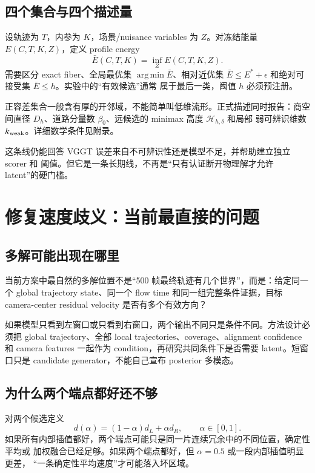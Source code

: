 \documentclass[UTF8,a4paper,11pt]{ctexart}
\newcommand{\argminop}{\operatorname*{arg\,min}}
\begin{document}
\subsection{四个集合与四个描述量}

设轨迹为 $T$，内参为 $K$，场景/nuisance variables 为 $Z$。对冻结能量
$E(C,T,K,Z)$，定义 profile energy
\begin{equation}
  \bar E(C,T,K)=\inf_Z E(C,T,K,Z).
\end{equation}
需要区分 exact fiber、全局最优集 $\argminop\bar E$、相对近优集
$\bar E\le E^*+\epsilon$ 和绝对可接受集 $\bar E\le h$。实验中的“有效候选”通常
属于最后一类，阈值 $h$ 必须预注册。

正容差集合一般含有厚的开邻域，不能简单叫低维流形。正式描述同时报告：商空间直径
$D_h$、道路分量数 $\beta_0$、远候选的 minimax 高度 $\mathcal H_{h,\delta}$ 和局部
弱可辨识维数 $k_{\rm weak}$。详细数学条件见附录。

这条线仍能回答 VGGT 误差来自不可辨识性还是模型不足，并帮助建立独立 scorer 和
阈值。但它是一条长期线，不再是“只有认证断开物理解才允许 latent”的硬门槛。

\section{修复速度歧义：当前最直接的问题}

\subsection{多解可能出现在哪里}

当前方案中最自然的多解位置不是“500 帧最终轨迹有几个世界”，而是：给定同一个
global trajectory state、同一个 flow time 和同一组完整条件证据，目标 camera-center
residual velocity 是否有多个有效方向？

如果模型只看到左窗口或只看到右窗口，两个输出不同只是条件不同。方法设计必须把
global trajectory、全部 local trajectories、coverage、alignment confidence 和 camera
features 一起作为 condition，再研究共同条件下是否需要 latent。短窗口只是 candidate
generator，不能自己宣布 posterior 多模态。

\subsection{为什么两个端点都好还不够}

对两个候选定义
\begin{equation}
  d(\alpha)=(1-\alpha)d_L+\alpha d_R,
  \qquad \alpha\in[0,1].
  \label{eq:residual-interpolation}
\end{equation}
如果所有内部插值都好，两个端点可能只是同一片连续冗余中的不同位置，确定性平均或
加权融合已经足够。如果两个端点都好，但 $\alpha=0.5$ 或一段内部插值明显更差，
“一条确定性平均速度”才可能落入坏区域。
\end{document}
